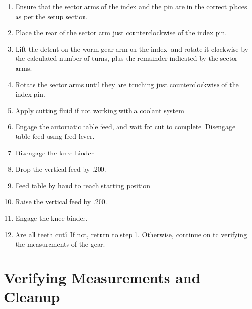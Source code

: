\documentclass[12pt,twoside,letterpaper]{article}
\begin{document}
\begin{enumerate}
\item Ensure that the sector arms of the index and the pin are in the correct places as per the setup section.
\item Place the rear of the sector arm just counterclockwise of the index pin.
\item Lift the detent on the worm gear arm on the index, and rotate it clockwise by the calculated number of turns, plus the remainder indicated by the sector arms.
\item Rotate the sector arms until they are touching just counterclockwise of the index pin.
\item Apply cutting fluid if not working with a coolant system.
\item Engage the automatic table feed,  and wait for cut to complete. Disengage table feed using feed lever.
\item Disengage the knee binder.
\item Drop the vertical feed by .200.
\item Feed table by hand to reach starting position.
\item Raise the vertical feed by .200.
\item Engage the knee binder.
\item Are all teeth cut? If not, return to step 1. Otherwise, continue on to verifying the measurements of the gear.
\end{enumerate}

\section{Verifying Measurements and Cleanup}
\end{document}
